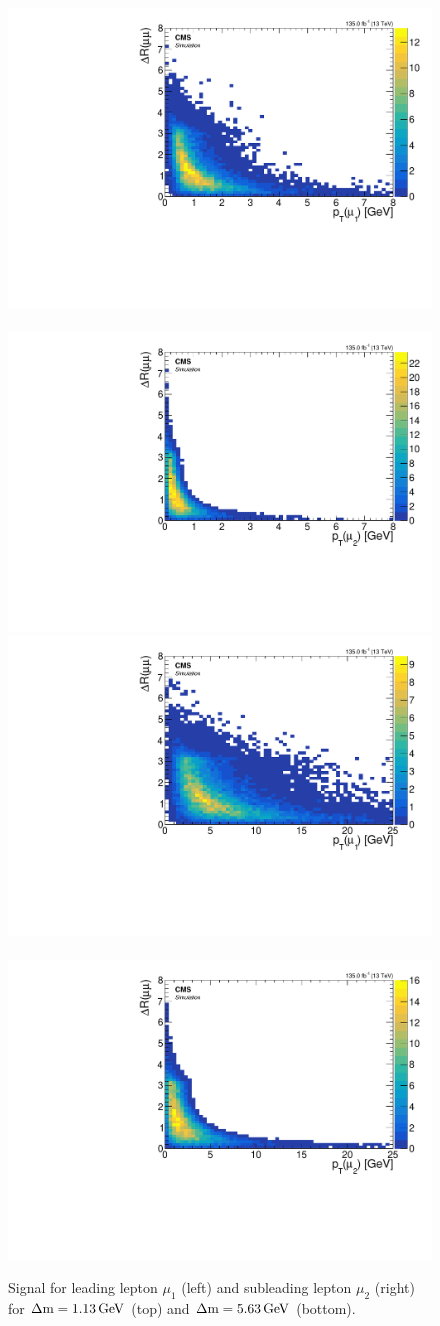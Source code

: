 \begin{figure}[h]
\centering
\includegraphics[width=0.48\linewidth]{plots/signal_muons_gen_delta_r_vs_pt/none_gen_delta_r_vs_pt_1.pdf} \,
\includegraphics[width=0.48\linewidth]{plots/signal_muons_gen_delta_r_vs_pt/none_gen_delta_r_vs_pt_2.pdf}  \\
\includegraphics[width=0.48\linewidth]{plots/signal_muons_gen_delta_r_vs_pt_dm5/none_gen_delta_r_vs_pt_1.pdf} \,
\includegraphics[width=0.48\linewidth]{plots/signal_muons_gen_delta_r_vs_pt_dm5/none_gen_delta_r_vs_pt_2.pdf}  \\
\caption[Signal \drmm \vs \pt]{ Signal \drmm \vs \pt for leading lepton $\mu_1$ (left) and subleading lepton $\mu_2$ (right) for $\Delta\mathrm{m}=1.13\,\text{Ge\hspace{-.08em}V}$ (top) and $\Delta\mathrm{m}=5.63\,\text{Ge\hspace{-.08em}V}$ (bottom).}
\label{fig:signal-gen-dr-pt}
\end{figure}

